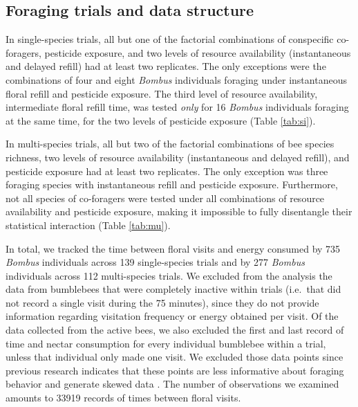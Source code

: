 \begin{refsection}
\section*{Foraging trials and data structure}

In single-species trials, all but one of the factorial combinations of  conspecific co-foragers, pesticide exposure, and two levels of resource availability (instantaneous and delayed refill) had at least two replicates. The only exceptions were the combinations of  four and eight \textit{Bombus} individuals foraging under instantaneous floral refill and pesticide exposure. The third level of resource availability, intermediate floral refill time, was tested \textit{only} for 16 \textit{Bombus} individuals foraging at the same time, for the two levels of pesticide exposure (Table \ref{tab:si}).

In multi-species trials, all but two of the factorial combinations of bee species richness,  two levels of resource availability (instantaneous and delayed refill), and pesticide exposure had at least two replicates. The only exception was three foraging species with instantaneous refill and pesticide exposure. Furthermore, not all species of co-foragers were tested under all combinations of resource availability and pesticide exposure, making it impossible to fully disentangle their statistical interaction (Table \ref{tab:mu}).

In total, we tracked the time between floral visits and energy consumed by 735 \textit{Bombus} individuals across 139 single-species trials and by 277 \textit{Bombus} individuals across 112 multi-species trials. We excluded from the analysis the data from bumblebees that were completely inactive within trials (i.e.\ that did not record a single visit during the 75 minutes), since they do not provide information regarding visitation frequency or energy obtained per visit. Of the data collected from the active bees, we also excluded the first and last record of time and nectar consumption for every individual bumblebee within a trial, unless that individual only made one visit. We excluded those data points since previous research indicates that these points are less informative about foraging behavior and generate skewed data \citep{edwards_revisiting_2007}. The number of observations we examined amounts to 33919 records of times between floral visits.


\end{refsection}
